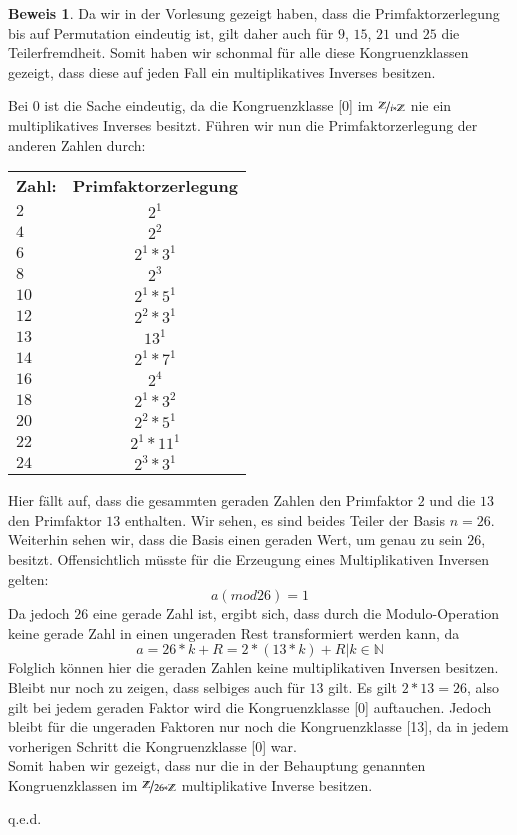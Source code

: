 \documentclass{article}
\newcommand*{\7}{\textbackslash}
\newcommand*{\N}{{\mathbb{N}}}
\newcommand*{\Z}{{\mathbb{Z}}}
\theoremstyle{remark}
\theoremstyle{definition}
\newtheorem*{Beweis}{Beweis}
\begin{document}
\begin{Beweis}
		Da wir in der Vorlesung gezeigt haben, dass die Primfaktorzerlegung bis auf Permutation eindeutig ist, gilt daher auch für $9$, $15$, $21$ und $25$ die Teilerfremdheit. Somit haben wir schonmal f\"ur alle diese Kongruenzklassen gezeigt, dass diese auf jeden Fall ein multiplikatives Inverses besitzen.

		Bei $0$ ist die Sache eindeutig, da die Kongruenzklasse [0] im $\nicefrac{\Z}{i*\Z}$ nie ein multiplikatives Inverses besitzt. F\"uhren wir nun die Primfaktorzerlegung der anderen Zahlen durch:
		
		\begin{tabular}{lc}
 			\textbf{Zahl:}&\textbf{Primfaktorzerlegung}\\
			$2$&$2^1$\\
			$4$&$2^2$\\
			$6$&$2^1*3^1$\\
			$8$&$2^3$\\
			$10$&$2^1*5^1$\\
			$12$&$2^2*3^1$\\
			$13$&$13^1$\\
			$14$&$2^1*7^1$\\
			$16$&$2^4$\\
			$18$&$2^1*3^2$\\
			$20$&$2^2*5^1$\\
			$22$&$2^1*11^1$\\
			$24$&$2^3*3^1$
		\end{tabular}
		
		Hier f\"allt auf, dass die gesammten geraden Zahlen den Primfaktor $2$ und die $13$ den Primfaktor $13$ enthalten. Wir sehen, es sind beides Teiler der Basis $n=26$. Weiterhin sehen wir, dass die Basis einen geraden Wert, um genau zu sein $26$, besitzt. Offensichtlich m\"usste f\"ur die Erzeugung eines Multiplikativen Inversen gelten:
		\[a (mod 26) = 1\]
		Da jedoch $26$ eine gerade Zahl ist, ergibt sich, dass durch die Modulo-Operation keine gerade Zahl in einen ungeraden Rest transformiert werden kann, da
		\[a = 26*k + R = 2*(13*k) + R | k\in\N\]
		Folglich k\"onnen hier die geraden Zahlen keine multiplikativen Inversen besitzen. Bleibt nur noch zu zeigen, dass selbiges auch f\"ur $13$ gilt. Es gilt $2*13=26$, also gilt bei jedem geraden Faktor wird die Kongruenzklasse [0] auftauchen. Jedoch bleibt f\"ur die ungeraden Faktoren nur noch die Kongruenzklasse [13], da in jedem vorherigen Schritt die Kongruenzklasse [0] war.\\
		Somit haben wir gezeigt, dass nur die in der Behauptung genannten Kongruenzklassen im $\nicefrac{\Z}{26*\Z}$ multiplikative Inverse besitzen.
		\begin{flushright}
    			q.e.d.
		\end{flushright}
	\end{Beweis}
\end{document}
